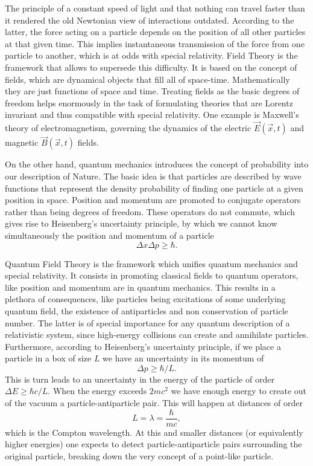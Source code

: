 The principle of a constant speed of light and that nothing can travel faster than it rendered the old Newtonian view of interactions outdated. According to the latter, the force acting on a particle depends on the position of all other particles at that given time. This implies instantaneous transmission of the force from one particle to another, which is at odds with special relativity. Field Theory is the framework that allows to supersede this difficulty. It is based on the concept of fields, which are dynamical objects that fill all of space-time. Mathematically they are just functions of space and time. Treating fields as the basic degrees of freedom helps enormously in the task of formulating theories that are Lorentz invariant and thus compatible with special relativity. One example is Maxwell's theory of electromagnetism, governing the dynamics of the electric $\vec{E}(\vec{x},t)$ and magnetic $\vec{B}(\vec{x},t)$ fields.

On the other hand, quantum mechanics introduces the concept of probability into our description of Nature. The basic idea is that particles are described by wave functions that represent the density probability of finding one particle at a given position in space. Position and momentum are promoted to conjugate operators rather than being degrees of freedom. These operators do not commute, which gives rise to Heisenberg's uncertainty principle, by which we cannot know simultaneously the position and momentum of a particle
\begin{equation*}
\Delta x\Delta p\geq\hbar.
\end{equation*} 

Quantum Field Theory is the framework which unifies quantum mechanics and special relativity. It consists in promoting classical fields to quantum operators, like position and momentum are in quantum mechanics. This results in a plethora of consequences, like particles being excitations of some underlying quantum field, the existence of antiparticles and non conservation of particle number. The latter is of special importance for any quantum description of a relativistic system, since high-energy collisions can create and annihilate particles. Furthermore, according to Heisenberg's uncertainty principle, if we place a particle in a box of size $L$ we have an uncertainty in its momentum of
\begin{equation*}
\Delta p\geq\hbar/L.
\end{equation*}
This is turn leads to an uncertainty in the energy of the particle of order $\Delta E\geq\hbar c/L$. When the energy exceeds $2mc^2$ we have enough energy to create out of the vacuum a particle-antiparticle pair. This will happen at distances of order 
\begin{equation*}
L=\lambda=\frac{\hbar}{mc},
\end{equation*}
which is the Compton wavelength. At this and smaller distances (or equivalently higher energies) one expects to detect particle-antiparticle pairs surrounding the original particle, breaking down the very concept of a point-like particle. 

